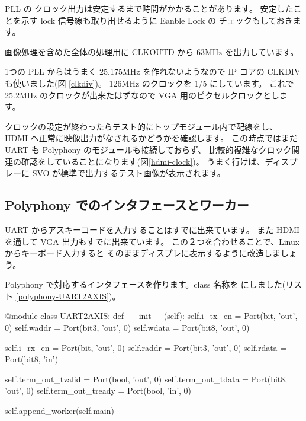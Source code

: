 PLL の クロック出力は安定するまで時間がかかることがあります。
安定したことを示す lock 信号線も取り出せるように Eanble Lock の
チェックもしておきます。

画像処理を含めた全体の処理用に CLKOUTD から 63MHz を出力しています。

1つの PLL からはうまく 25.175MHz を作れないようなので
IP コアの CLKDIV も使いました(図 \ref{clkdiv})。
126MHz のクロックを 1/5 にしています。
これで 25.2MHz のクロックが出来たはずなので
VGA 用のピクセルクロックとします。

クロックの設定が終わったらテスト的にトップモジュール内で配線をし、
HDMI へ正常に映像出力がなされるかどうかを確認します。
この時点ではまだ UART も Polyphony のモジュールも接続しておらず、
比較的複雑なクロック関連の確認をしていることになります(図\ref{hdmi-clock})。
うまく行けば、ディスプレーに SVO が標準で出力するテスト画像が表示されます。


\subsection{Polyphony でのインタフェースとワーカー}
UART からアスキーコードを入力することはすでに出来ています。
また HDMI を通して VGA 出力もすでに出来ています。
この２つを合わせることで、Linux からキーボード入力すると
そのままディスプレに表示するように改造しましょう。

Polyphony で対応するインタフェースを作ります。class 名称を
 にしました(リスト \ref{polyphony-UART2AXIS})。

\begin{python}[label=polyphony-UART2AXIS, caption="Polyphony の UART2AXIS インタフェース"]
@module
class UART2AXIS:
    def __init__(self):
        self.i_tx_en = Port(bit, 'out', 0)
        self.waddr = Port(bit3, 'out', 0)
        self.wdata = Port(bit8, 'out', 0)

        self.i_rx_en = Port(bit, 'out', 0)
        self.raddr = Port(bit3, 'out', 0)
        self.rdata = Port(bit8, 'in')

        self.term_out_tvalid = Port(bool, 'out', 0)
        self.term_out_tdata = Port(bit8, 'out', 0)
        self.term_out_tready = Port(bool, 'in', 0)

        self.append_worker(self.main)
\end{python}

